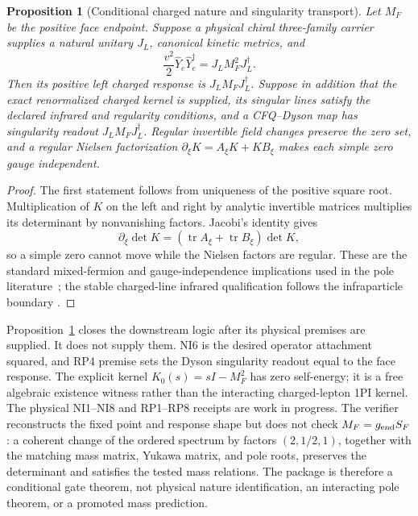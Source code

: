 \documentclass[11pt]{article}
\newtheorem{proposition}[theorem]{Proposition}
\begin{document}
\begin{proposition}[Conditional charged nature and singularity transport]
\label{prop:charged-nature-pole-transport}
Let \(M_F\) be the positive face endpoint.  Suppose a physical chiral
three-family carrier supplies a natural unitary \(J_L\), canonical kinetic
metrics, and
\[
 \frac{v^2}{2}\widehat Y_e\widehat Y_e^\dagger
 =J_LM_F^2J_L^\dagger.                                  \tag{NI6}
\]
Then its positive left charged response is \(J_LM_FJ_L^\dagger\).  Suppose in
addition that the exact renormalized charged kernel is supplied, its singular
lines satisfy the declared infrared and regularity conditions, and a
CFQ--Dyson map has singularity readout \(J_LM_FJ_L^\dagger\).  Regular
invertible field changes preserve the zero set, and a regular Nielsen
factorization \(\partial_\xi K=A_\xi K+KB_\xi\) makes each simple zero gauge
independent.
\end{proposition}

\begin{proof}
The first statement follows from uniqueness of the positive square root.
Multiplication of \(K\) on the left and right by analytic invertible matrices
multiplies its determinant by nonvanishing factors.  Jacobi's identity gives
\[
 \partial_\xi\det K=(\operatorname{tr}A_\xi+
 \operatorname{tr}B_\xi)\det K,
\]
so a simple zero cannot move while the Nielsen factors are regular.  These are
the standard mixed-fermion and gauge-independence implications used in the
pole literature~\cite{kniehl2013,gambino1999}; the stable charged-line
infrared qualification follows the infraparticle boundary
\cite{buchholz1986,duch2023}.
\end{proof}

Proposition~\ref{prop:charged-nature-pole-transport} closes the downstream
logic after its physical premises are supplied.  It does not supply them.
NI6 is the desired operator attachment squared, and RP4
premise sets the Dyson singularity readout equal to the face response.
The explicit kernel \(K_0(s)=sI-M_F^2\) has zero self-energy; it is a
free algebraic existence witness rather than the interacting charged-lepton
1PI kernel.  The physical NI1--NI8 and RP1--RP8 receipts are work in progress.
The verifier reconstructs the fixed point and response shape but does not check
\(M_F=g_{\rm end}S_F\): a coherent change
of the ordered spectrum by factors \((2,1/2,1)\), together with the matching
mass matrix, Yukawa matrix, and pole roots, preserves the determinant and
satisfies the tested mass relations.  The package is therefore a conditional
gate theorem, not physical nature identification, an interacting pole theorem,
or a promoted mass prediction.
\end{document}
